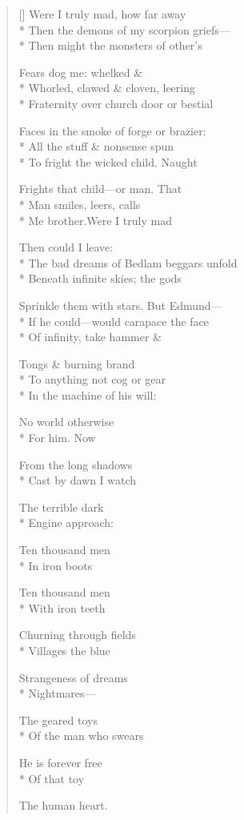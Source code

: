 \label{ch:lear_ap}
\settowidth{\versewidth}{Sprinkle them with stars.   But Edmund---}
\begin{verse}[\versewidth]
Were I truly mad, how far away\\*
Then the demons of my scorpion griefs---\\*
Then might the monsters of other's

Fears dog me: whelked \&\\*
Whorled, clawed \& cloven, leering\\*
Fraternity over church door or bestial

Faces in the smoke of forge or brazier:\\*
All the stuff \& nonsense spun\\*
To fright the wicked child.   Naught

Frights that child---or man.   That\\*
Man smiles, leers, calls\\*
Me brother.\qquad Were I truly mad

Then could I leave:\\*
The bad dreams of Bedlam beggars unfold\\*
Beneath infinite skies; the gods

Sprinkle them with stars.   But Edmund---\\*
If he could---would carapace the face\\*
Of infinity, take hammer \&

Tongs \& burning brand\\*
To anything not cog or gear\\*
In the machine of his will:

No world otherwise\\*
For him.\hspace*{3\vgap} Now

From the long shadows\\*
Cast by dawn I watch

The terrible dark\\*
Engine approach:

Ten thousand men\\*
In iron boots

Ten thousand men\\*
With iron teeth

Churning through fields\\*
Villages\hspace*{3\vgap} the blue

Strangeness of dreams\\*
Nightmares---

The geared toys\\*
Of the man who swears

He is forever free\\*
Of that toy

The human heart.
\end{verse}
